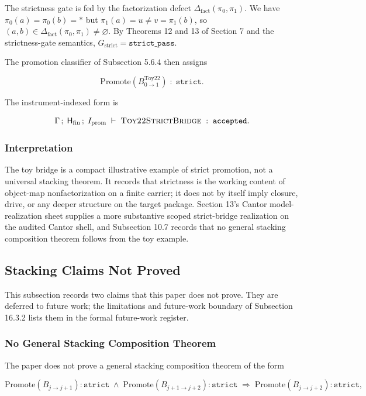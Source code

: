 \documentclass[11pt]{article}
\theoremstyle{definition}
\begin{document}
The strictness gate is fed by the factorization defect \(\Delta_{\mathrm{fact}}(\pi_0,\pi_1)\). We have \(\pi_0(a)=\pi_0(b)=*\) but \(\pi_1(a)=u\neq v=\pi_1(b)\), so \((a,b)\in\Delta_{\mathrm{fact}}(\pi_0,\pi_1)\neq\varnothing\). By Theorems 12 and 13 of Section 7 and the strictness-gate semantics, \(G_{\mathrm{strict}}=\texttt{strict\_pass}\).

The promotion classifier of Subsection 5.6.4 then assigns

\[
\mathrm{Promote}(B_{0\to 1}^{\mathrm{Toy22}})\;:\;\texttt{strict}.
\]

The instrument-indexed form is

\[
\Gamma\,;\;\mathsf H_{\mathrm{fin}}\,;\;I_{\mathrm{prom}}\;\vdash\;\textsc{Toy22StrictBridge}\;:\;\texttt{accepted}.
\]

\subsubsection{Interpretation}

The toy bridge is a compact illustrative example of strict promotion, not a universal stacking theorem. It records that strictness is the working content of object-map nonfactorization on a finite carrier; it does not by itself imply closure, drive, or any deeper structure on the target package. Section 13's Cantor model-realization sheet supplies a more substantive scoped strict-bridge realization on the audited Cantor shell, and Subsection 10.7 records that no general stacking composition theorem follows from the toy example.

\subsection{Stacking Claims Not Proved}

This subsection records two claims that this paper does not prove. They are deferred to future work; the limitations and future-work boundary of Subsection 16.3.2 lists them in the formal future-work register.

\subsubsection{No General Stacking Composition Theorem}

The paper does not prove a general stacking composition theorem of the form

\[
\mathrm{Promote}(B_{j\to j+1}):\texttt{strict}\;\wedge\;\mathrm{Promote}(B_{j+1\to j+2}):\texttt{strict}\;\Longrightarrow\;\mathrm{Promote}(B_{j\to j+2}):\texttt{strict},
\]
\end{document}
